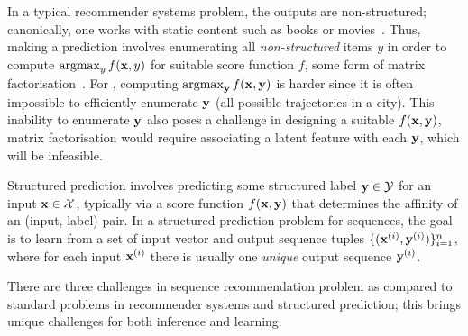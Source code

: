 In a typical recommender systems problem, the outputs are non-structured; canonically, one works with {static} content such as books or movies~\citep{Goldberg:1992,Sarwar:2001,Netflix}.
Thus, making a prediction involves enumerating all {\em non-structured} items $y$ in order to compute $\operatorname*{argmax}_y f(\mathbf{x},y)$ for suitable score function $f$, \eg some form of matrix factorisation~\citep{Koren:2009}.
For {\seqrec}, computing $\operatorname*{argmax}_{\mathbf{y}} f(\mathbf{x},\mathbf{y})$ is harder since it is often impossible to efficiently enumerate $\mathbf{y}$ (\eg all possible trajectories in a city).
This inability to enumerate $\mathbf{y}$ also poses a challenge in designing a suitable $f(\mathbf{x},\mathbf{y})$,
\eg
matrix factorisation
would require associating a latent feature with each $\mathbf{y}$, which will be infeasible.



Structured prediction involves predicting some structured label $\mathbf{y} \in \mathcal{Y}$ for an input $\mathbf{x} \in \mathcal{X}$,
typically via a score function $f(\mathbf{x},\mathbf{y})$ that determines the affinity of an (input, label) pair.
In a structured prediction problem for sequences, the goal is to learn from a set of input vector and output sequence tuples
$\{ (\mathbf{x}^{({i})}, \mathbf{y}^{({i})}) \}_{i = 1}^n$, where
for each input $\mathbf{x}^{({i})}$ there is usually one \emph{unique} output sequence $\mathbf{y}^{({i})}$.

There are three challenges in sequence recommendation problem as compared to
standard problems in recommender systems and structured prediction;
this brings unique challenges for both inference and learning.


